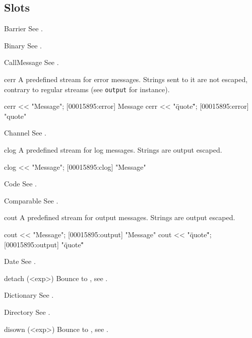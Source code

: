 \subsection{Slots}
\begin{urbiscriptapi}
\item[Barrier] See .
\item[Binary] See .
\item[CallMessage] See .

\item[cerr] A predefined stream for error messages.  Strings sent to
  it are not escaped, contrary to regular streams (see
  \lstinline|output| for instance).
\begin{urbiscript}
cerr << "Message";
[00015895:error] Message
cerr << "\"quote\"";
[00015895:error] "quote"
\end{urbiscript}

\item[Channel] See .

\item[clog] A predefined stream for log messages.  Strings are output
  escaped.
\begin{urbiscript}
clog << "Message";
[00015895:clog] "Message"
\end{urbiscript}

\item[Code] See .
\item[Comparable] See .

\item[cout] A predefined stream for output messages.  Strings are
  output escaped.
\begin{urbiscript}
cout << "Message";
[00015895:output] "Message"
cout << "\"quote\"";
[00015895:output] "\"quote\""
\end{urbiscript}

\item[Date] See .

\item[detach](<exp>)%
  Bounce to , see .

\item[Dictionary] See .
\item[Directory] See .

\item[disown](<exp>)%
  Bounce to , see .


\end{urbiscriptapi}
